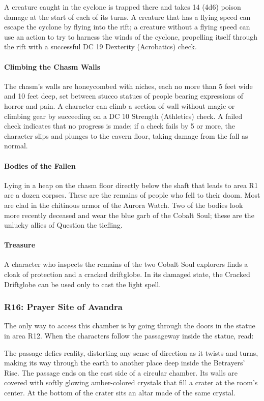\documentclass[10pt,a4paper,twoside,bg=print,twocolumn,openany,nodeprecatedcode]{dndbook}
\begin{document}
A creature caught in the cyclone is trapped there and takes 14 (4d6) poison damage at the start of each of its turns. A creature that has a flying speed can escape the cyclone by flying into the rift; a creature without a flying speed can use an action to try to harness the winds of the cyclone, propelling itself through the rift with a successful DC 19 Dexterity (Acrobatics) check.

\paragraph{Climbing the Chasm Walls}
The chasm's walls are honeycombed with niches, each no more than 5 feet wide and 10 feet deep, set between stucco statues of people bearing expressions of horror and pain. A character can climb a section of wall without magic or climbing gear by succeeding on a DC 10 Strength (Athletics) check. A failed check indicates that no progress is made; if a check fails by 5 or more, the character slips and plunges to the cavern floor, taking damage from the fall as normal.

\paragraph{Bodies of the Fallen}
Lying in a heap on the chasm floor directly below the shaft that leads to area R1 are a dozen corpses. These are the remains of people who fell to their doom. Most are clad in the chitinous armor of the Aurora Watch. Two of the bodies look more recently deceased and wear the blue garb of the Cobalt Soul; these are the unlucky allies of Question the tiefling.

\paragraph{Treasure}
A character who inspects the remains of the two Cobalt Soul explorers finds a cloak of protection and a cracked driftglobe. In its damaged state, the Cracked Driftglobe can be used only to cast the light spell.

\subsubsection{R16: Prayer Site of Avandra}
The only way to access this chamber is by going through the doors in the statue in area R12. When the characters follow the passageway inside the statue, read:

\begin{DndReadAloud}{}
The passage defies reality, distorting any sense of direction as it twists and turns, making its way through the earth to another place deep inside the Betrayers' Rise. The passage ends on the east side of a circular chamber. Its walls are covered with softly glowing amber-colored crystals that fill a crater at the room's center. At the bottom of the crater sits an altar made of the same crystal.

\end{DndReadAloud}
\end{document}
